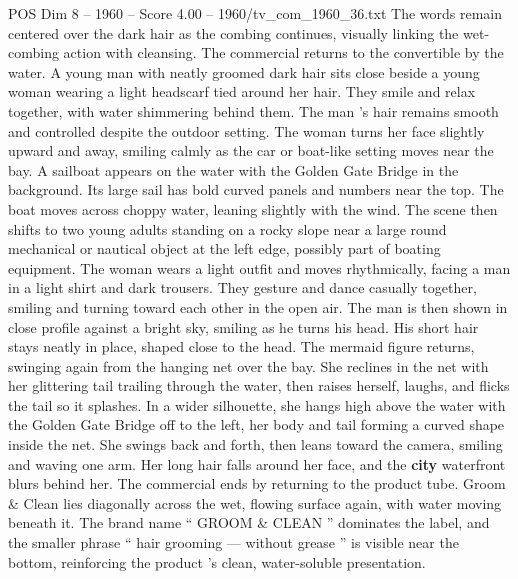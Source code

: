 \begin{textsample}{POS Dim 8 – 1960 – Score 4.00 – 1960/tv\_com\_1960\_36.txt}
The words remain centered over the dark hair as the combing continues, visually linking the wet-combing action with cleansing.
The commercial returns to the convertible by the water.
A young man with neatly groomed dark hair sits close beside a young woman wearing a light headscarf tied around her hair.
They smile and relax together, with water shimmering behind them.
The man ’s hair remains smooth and controlled despite the outdoor setting.
The woman turns her face slightly upward and away, smiling calmly as the car or boat-like setting moves near the bay.
A sailboat appears on the water with the Golden Gate Bridge in the background.
Its large sail has bold curved panels and numbers near the top.
The boat moves across choppy water, leaning slightly with the wind.
The scene then shifts to two young adults standing on a rocky slope near a large round mechanical or nautical object at the left edge, possibly part of boating equipment.
The woman wears a light outfit and moves rhythmically, facing a man in a light shirt and dark trousers.
They gesture and dance casually together, smiling and turning toward each other in the open air.
The man is then shown in close profile against a bright sky, smiling as he turns his head.
His short hair stays neatly in place, shaped close to the head.
The mermaid figure returns, swinging again from the hanging net over the bay.
She reclines in the net with her glittering tail trailing through the water, then raises herself, laughs, and flicks the tail so it splashes.
In a wider silhouette, she hangs high above the water with the Golden Gate Bridge off to the left, her body and tail forming a curved shape inside the net.
She swings back and forth, then leans toward the camera, smiling and waving one arm.
Her long hair falls around her face, and the \textbf{city} waterfront blurs behind her.
The commercial ends by returning to the product tube.
Groom \& Clean lies diagonally across the wet, flowing surface again, with water moving beneath it.
The brand name “ GROOM \& CLEAN ” dominates the label, and the smaller phrase “ hair grooming — without grease ” is visible near the bottom, reinforcing the product ’s clean, water-soluble presentation.

\end{textsample}
